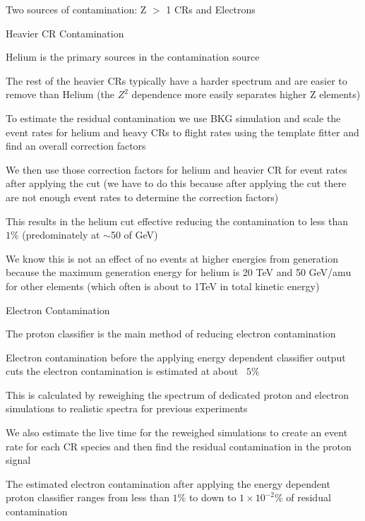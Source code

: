 \documentclass{article}
\begin{document}
\begin{myEnumerate}
\begin{myEnumerate}
			\item Two sources of contamination: Z $>$ 1 CRs and Electrons
			\item Heavier CR Contamination
			\begin{myEnumerate}
				\item Helium is the primary sources in the contamination source
				\item The rest of the heavier CRs typically have a harder spectrum and are easier to remove than Helium (the $Z^2$ dependence more easily separates higher Z elements)
				\item To estimate the residual contamination we use BKG simulation and scale the event rates for helium and heavy CRs to flight rates using the template fitter and find an overall correction factors
				\item We then use those correction factors for helium and heavier CR for event rates after applying the cut (we have to do this because after applying the cut there are not enough event rates to determine the correction factors)
				\item This results in the helium cut effective reducing the contamination to less than $1\%$ (predominately at $\sim$50 of GeV)
				\item We know this is not an effect of no events at higher energies from generation because the maximum generation energy for helium is 20 TeV and 50 GeV/amu for other elements (which often is about to 1TeV in total kinetic energy)
			\end{myEnumerate}
			\item Electron Contamination
			\begin{myEnumerate}
				\item The proton classifier is the main method of reducing electron contamination
				\item Electron contamination before the applying energy dependent classifier output cuts the electron contamination is estimated at about ~$5\%$
				\item This is calculated by reweighing the spectrum of dedicated proton and electron simulations to realistic spectra for previous experiments
				\item We also estimate the live time for the reweighed simulations to create an event rate for each CR species and then find the residual contamination in the proton signal
				\item The estimated electron contamination after applying the energy dependent proton classifier ranges from less than $1\%$ to down to $1 \times 10^{-2}\%$ of residual contamination

\end{myEnumerate}
\end{myEnumerate}
\end{myEnumerate}
\end{document}
